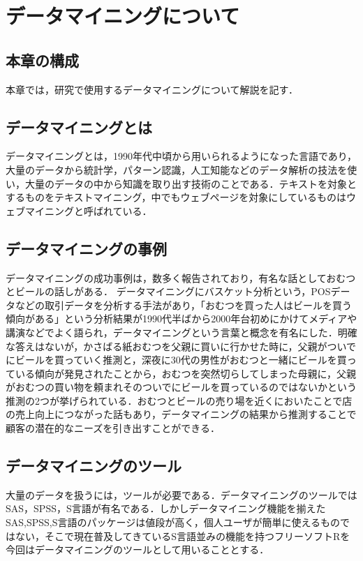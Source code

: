\chapter{データマイニングについて}
\section{本章の構成}
本章では，研究で使用するデータマイニングについて解説を記す．

\section{データマイニングとは}
データマイニングとは，1990年代中頃から用いられるようになった言語であり，大量のデータから統計学，パターン認識，人工知能などのデータ解析の技法を使い，大量のデータの中から知識を取り出す技術のことである．テキストを対象とするものをテキストマイニング，中でもウェブページを対象にしているものはウェブマイニングと呼ばれている．

\section{データマイニングの事例}
データマイニングの成功事例は，数多く報告されており，有名な話としておむつとビールの話しがある．
データマイニングにバスケット分析という，POSデータなどの取引データを分析する手法があり，「おむつを買った人はビールを買う傾向がある」という分析結果が1990代半ばから2000年台初めにかけてメディアや講演などでよく語られ，データマイニングという言葉と概念を有名にした．明確な答えはないが，かさばる紙おむつを父親に買いに行かせた時に，父親がついでにビールを買っていく推測と，深夜に30代の男性がおむつと一緒にビールを買っている傾向が発見されたことから，おむつを突然切らしてしまった母親に，父親がおむつの買い物を頼まれそのついでにビールを買っているのではないかという推測の2つが挙げられている．おむつとビールの売り場を近くにおいたことで店の売上向上につながった話もあり，データマイニングの結果から推測することで顧客の潜在的なニーズを引き出すことができる．

\section{データマイニングのツール}
大量のデータを扱うには，ツールが必要である．データマイニングのツールではSAS，SPSS，S言語が有名である．しかしデータマイニング機能を揃えたSAS,SPSS,S言語のパッケージは値段が高く，個人ユーザが簡単に使えるものではない，そこで現在普及してきているS言語並みの機能を持つフリーソフトRを今回はデータマイニングのツールとして用いることとする．
